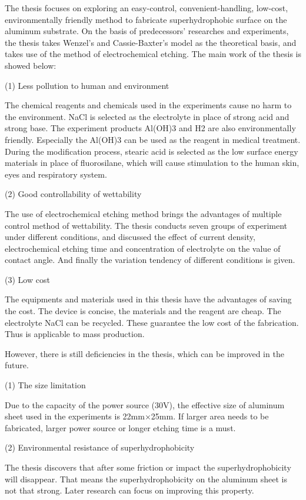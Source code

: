  \setlength{\baselineskip}{20pt}
 \begin{conclusion}

    The thesis focuses on exploring an easy-control, convenient-handling, low-cost, environmentally friendly method to fabricate superhydrophobic surface on the aluminum substrate. On the basis of predecessors’ researches and experiments, the thesis takes Wenzel’s and Cassie-Baxter’s model as the theoretical basis, and takes use of the method of electrochemical etching. The main work of the thesis is showed below:

    (1)	Less pollution to human and environment

    The chemical reagents and chemicals used in the experiments cause no harm to the environment. NaCl is selected as the electrolyte in place of strong acid and strong base. The experiment products Al(OH)3 and H2 are also environmentally friendly. Especially the Al(OH)3 can be used as the reagent in medical treatment. During the modification process, stearic acid is selected as the low surface energy materials in place of fluorosilane, which will cause stimulation to the human skin, eyes and respiratory system.

    (2)	Good controllability of wettability

    The use of electrochemical etching method brings the advantages of multiple control method of wettability. The thesis conducts seven groups of experiment under different conditions, and discussed the effect of current density, electrochemical etching time and concentration of electrolyte on the value of contact angle. And finally the variation tendency of different conditions is given. 

    (3)	Low cost

    The equipments and materials used in this thesis have the advantages of saving the cost. The device is concise, the materials and the reagent are cheap. The electrolyte NaCl can be recycled. These guarantee the low cost of the fabrication. Thus is applicable to mass production.

    However, there is still deficiencies in the thesis, which can be improved in the future.

    (1)	The size limitation

    Due to the capacity of the power source (30V), the effective size of aluminum sheet used in the experiments is 22mm×25mm. If larger area needs to be fabricated, larger power source or longer etching time is a must. 

    (2)	Environmental resistance of superhydrophobicity
    
    The thesis discovers that after some friction or impact the superhydrophobicity will disappear. That means the superhydrophobicity on the aluminum sheet is not that strong. Later research can focus on improving this property.
    

\end{conclusion}


